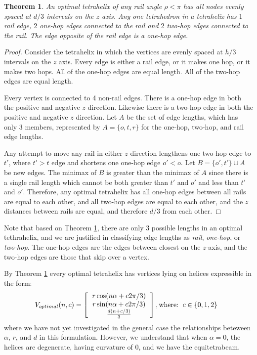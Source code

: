 \documentclass[11pt]{article}
\newtheorem{theorem}{Theorem}
\begin{document}
\begin{theorem}
  \label{eventhirds}
  An optimal tetrahelix of any rail angle $\rho < \pi$ has all nodes evenly spaced at $d/3$ intervals on the $z$ axis.
  Any one tetrahedron in a tetrahelix has $1$ rail edge, $2$ one-hop edges connected to the rail and $2$ two-hop edges connected to the rail.
  The edge opposite of the rail edge is a one-hop edge.
\end{theorem}

\begin{proof}
    Consider the tetrahelix in which the vertices are evenly spaced at
    $h/3$ intervals on the $z$ axis. Every edge is either a rail edge,
    or it makes one hop, or it makes two hops. All of the one-hop
    edges are equal length.  All of the two-hop edges are equal
    length.

    Every vertex is connected to 4 non-rail edges. There is a one-hop edge
    in both the positive and negative $z$ direction. Likewise there is a two-hop
    edge in both the positive and negative $z$ direction. Let $A$ be the set
    of edge lengths, which has only 3 members, represented by $A = \{o,t,r\}$ for
    the one-hop, two-hop, and rail edge lengths.

    Any attempt to move any rail in either $z$ direction lengthens one two-hop edge to $t'$, where $t' > t$
    edge and shortens one one-hop edge $o' < o$. Let $B = \{o',t' \} \cup A$ be new edges.
    The minimax of $B$ is greater than the minimax of $A$ since there is a single rail length which cannot be both greater
    than $t'$ and $o'$ and less than $t'$ and $o'$.
    Therefore, any optimal tetrahelix has all one-hop edges between all rails are equal to each other, and
    all two-hop edges are equal to each other, and the $z$ distances between rails are equal, and therefore
    $d/3$ from each other.
\end{proof}

 Note that based on Theorem \ref{eventhirds}, there are only 3 possible lengths in an optimal tethrahelix,
 and we are justified in classifying edge lengths as \emph{rail}, \emph{one-hop}, or
\emph{two-hop}. The one-hop edges are the edges between closest on the $z$-axis, and the two-hop edges are those that skip over a vertex.

By Theorem \ref{eventhirds} every optimal tetrahelix has vertices lying on helices expressible in the form:
\[
V_{optimal}(n,c) =
\left [
  \begin{tabular}{c}
   $ r \cos(n \alpha +  c 2 \pi /3)$\\
   $ r \sin(n \alpha +  c 2 \pi /3) $\\
   $ \frac{d(n +c / 3)}{3}   $
  \end{tabular}
  \right ],
\text{where:}
\begin{tabular}{c}
  $c \in \{0,1,2\}$
  \end{tabular}      
\]
where we have not yet investigated in the general case the relationships beteween $\alpha$, $r$, and $d$ in this formulation.
However, we understand that when $\alpha = 0$, the helices are degenerate, having curvature of $0$, and
we have the equitetrabeam.
\end{document}
